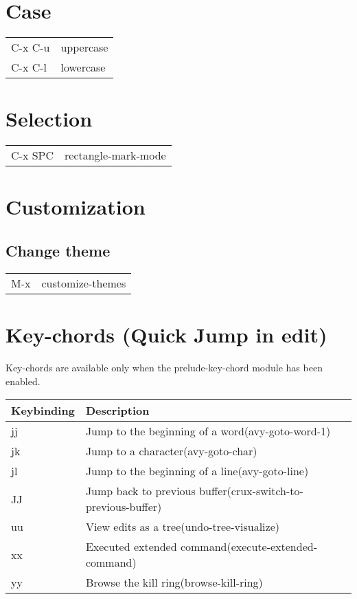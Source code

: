 \documentclass[11pt]{article}
\begin{document}
\section{Case}
\label{sec:orgec40a6b}
\begin{center}
\begin{tabular}{ll}
\hline
C-x C-u & uppercase\\
C-x C-l & lowercase\\
\end{tabular}
\end{center}

\section{Selection}
\label{sec:org1a7a206}
\begin{center}
\begin{tabular}{ll}
\hline
C-x SPC & rectangle-mark-mode\\
\end{tabular}
\end{center}

\section{Customization}
\label{sec:org0c50722}
\subsection{Change theme}
\label{sec:org2d03689}
\begin{center}
\begin{tabular}{ll}
\hline
M-x & customize-themes\\
\end{tabular}
\end{center}

\section{Key-chords (Quick Jump in edit)}
\label{sec:org0ab744f}
Key-chords are available only when the prelude-key-chord module has been enabled.\\

\begin{center}
\begin{tabular}{ll}
Keybinding & Description\\
\hline
jj & Jump to the beginning of a word(avy-goto-word-1)\\
jk & Jump to a character(avy-goto-char)\\
jl & Jump to the beginning of a line(avy-goto-line)\\
JJ & Jump back to previous buffer(crux-switch-to-previous-buffer)\\
uu & View edits as a tree(undo-tree-visualize)\\
xx & Executed extended command(execute-extended-command)\\
yy & Browse the kill ring(browse-kill-ring)\\
\end{tabular}
\end{center}
\end{document}
